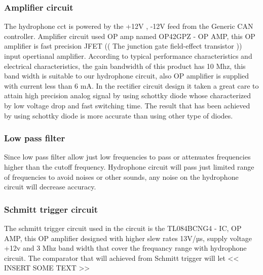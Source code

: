 \subsubsection{Amplifier circuit }
The hydrophone cct is powered by the +12V , -12V feed from the Generic CAN controller. Amplifier circuit used OP amp named OP42GPZ - OP AMP, this OP amplifier is fast precision JFET (( The junction gate field-effect transistor )) input opertianal amplifier.
According to typical performance characteristics and electrical characteristics, the gain bandwidth of this product has 10 Mhz, this band width is suitable to our hydrophone circuit, also OP amplifier is supplied with current less than 6 mA.
In the rectifier circuit design it taken a great care to attain high precision analog signal by using   schottky diode whose characterized by low voltage drop and fast switching time.
The result that has been achieved by using schottky diode is more accurate than using other type of diodes.  

\subsubsection{Low pass filter}
Since low pass filter allow just low frequencies to pass or attenuates frequencies higher than the cutoff frequency.
Hydrophone circuit will pass just limited range of frequencies to avoid noises or other sounds, any noise on the hydrophone circuit will decrease accuracy.    
 
 \subsubsection{Schmitt trigger  circuit}
The schmitt trigger circuit used in the circuit is the TL084BCNG4 - IC, OP AMP, this OP amplifier designed with higher slew rates 13V/µs, supply voltage +12v and 3 Mhz band width that cover the frequancy range with hydrophone circuit. 
The comparator that will achieved from Schmitt trigger will let << INSERT SOME TEXT >> 
 


